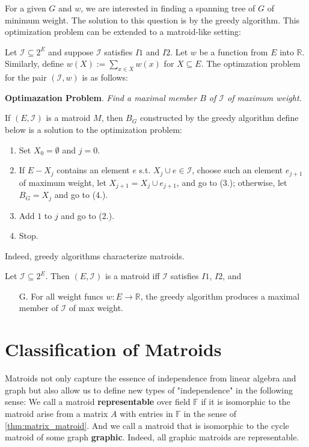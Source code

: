 \documentclass[a4paper,10pt]{article}
\renewcommand{\vocab}[1]{\textbf{#1}}
\newcommand{\II}{\mathcal{I}}
\begin{document}
For a given $G$ and $w$, we are interested in finding a spanning tree of $G$ of minimum weight. The solution to this question is by the greedy algorithm. This optimization problem can be extended to a matroid-like setting:

Let $\II\subseteq 2^E$ and suppose $\II$ satisfies $I1$ and $I2$. Let $w$ be a function from $E$ into $\mathbb{R}$. Similarly, define $w(X):=\sum_{x\in X}^{}w(x)$ for $X\subseteq E$. The optimzation problem for the pair $(\II,w)$ is as follows:

\begin{mdframed}
  \textbf{Optimazation Problem}. 
  \textit{Find a maximal member $B$ of $\II$ of maximum weight.}
\end{mdframed}

\begin{lemma}[lem:]{}
  If $(E,\II)$ is a matroid $M$, then $B_G$ constructed by the greedy algorithm define below is a solution to the optimization problem:
  \begin{enumerate}
    \item Set $X_0=\emptyset $ and $j=0$.
    \item If $E-X_j$ contains an element $e$ s.t. $X_j\cup e\in \II$, choose such an element $e_{j+1}$ of maximum weight, let $X_{j+1}=X_j\cup e_{j+1}$, and go to (3.); otherwise, let $B_G=X_j$ and go to (4.).
    \item Add $1$ to $j$ and go to (2.).
    \item Stop.
  \end{enumerate}
\end{lemma}

Indeed, greedy algorithms characterize matroids.

\begin{theorem}[thm:]{}
  Let $\II\subseteq 2^E$. Then $(E,\II)$ is a matroid iff $\II$ satisfies $I1$, $I2$, and
  \begin{enumerate}
    \item [G.] For all weight funcs $w:E\rightarrow \mathbb{R}$, the greedy algorithm produces a maximal member of $\II$ of max weight.
  \end{enumerate}
\end{theorem}

\section{Classification of Matroids}

Matroids not only capture the essence of independence from linear algebra and graph but also allow us to define new types of "independence" in the following sense: We call a matroid \vocab{representable} over field $\mathbb{F}$ if it is isomorphic to the matroid arise from a matrix $A$ with entries in $\mathbb{F}$ in the sense of \cref{thm:matrix_matroid}. And we call a matroid that is isomorphic to the cycle matroid of some graph \vocab{graphic}. Indeed, all graphic matroids are representable.
\end{document}
